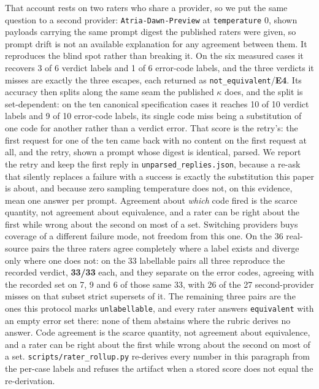 \documentclass[10pt,twocolumn]{article}
\begin{document}
That account rests on two raters who share a provider, so we put the same question to a
second provider: \texttt{Atria-Dawn-Preview} at \texttt{temperature} 0, shown payloads
carrying the same prompt digest the published raters were given, so prompt drift is not an
available explanation for any agreement between them. It
reproduces the blind spot rather than breaking it. On the six measured cases it recovers
3 of 6 verdict labels and 1 of 6 error-code labels, and the three verdicts it misses are
exactly the three escapes, each returned as \texttt{not\_equivalent}/\textbf{E4}. Its
accuracy then splits along the same seam the published $\kappa$ does, and the split is
set-dependent: on the ten canonical specification cases it reaches 10 of 10 verdict labels
and 9 of 10 error-code labels, its single code miss being a substitution of one code for
another rather than a verdict error. That score is the retry's: the first request for one of
the ten came back with no content on the first request at all, and the retry, shown a prompt
whose digest is identical, parsed. We report the retry and keep the first reply in
\texttt{unparsed\_replies.json}, because a re-ask that silently replaces a failure with a
success is exactly the substitution this paper is about, and because zero sampling temperature
does not, on this evidence, mean one answer per prompt. Agreement about \emph{which} code fired is the scarce quantity, not
agreement about equivalence, and a rater can be right about the first while wrong about
the second on most of a set. Switching providers buys coverage of a different failure
mode, not freedom from this one. On the 36 real-source pairs the three raters agree
completely where a label exists and diverge only where one does not: on the 33 labellable
pairs all three reproduce the recorded verdict, \textbf{33/33} each, and they separate on
the error codes, agreeing with the recorded set on 7, 9 and 6 of those same 33, with 26 of
the 27 second-provider misses on that subset strict supersets of it. The remaining three pairs are the ones
this protocol marks \texttt{unlabellable}, and every rater answers \texttt{equivalent} with
an empty error set there: none of them abstains where the rubric derives no answer. Code
agreement is the scarce quantity, not agreement about equivalence, and a rater can be right
about the first while wrong about the second on most of a set.
\texttt{scripts/rater\_rollup.py} re-derives every number
in this paragraph from the per-case labels and refuses the artifact when a stored score
does not equal the re-derivation.
\end{document}
